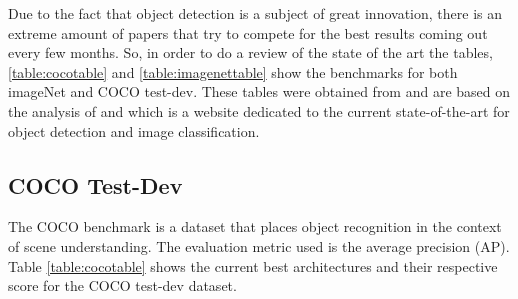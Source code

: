 \par Due to the fact that object detection is a subject of great innovation, there is an extreme amount of papers that try to compete for the best results coming out every few months. So, in order to do a review of the state of the art the tables, \ref{table:cocotable} and \ref{table:imagenettable} show the benchmarks for both imageNet and COCO test-dev. These tables were obtained from \cite{Ribeiro} and are based on the analysis of \cite{papers_image} and \cite{papers_object} which is a website dedicated to  the current state-of-the-art for object detection and image classification.


\newpage




\subsection{COCO Test-Dev}

\par The COCO benchmark \cite{Lin2014} is a dataset that places object recognition in the context of scene understanding. The evaluation metric used is the average precision (AP). Table \ref{table:cocotable} shows the current best architectures and their respective score for the COCO test-dev dataset.

